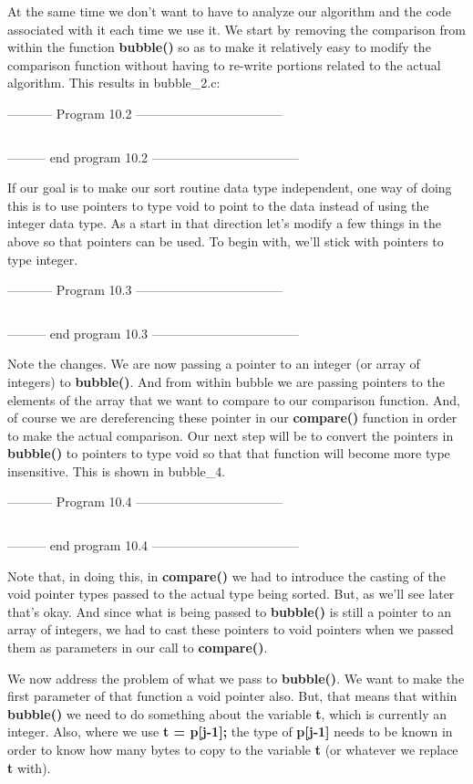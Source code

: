 At the same time we don't want to have to analyze our algorithm and the
code associated with it each time we use it. We start by removing the
comparison from within the function \textbf{bubble()} so as to make it
relatively easy to modify the comparison function without having to
re-write portions related to the actual algorithm. This results in
bubble\_2.c:

-----------  Program 10.2  -----------------------------------
\inputminted[breaklines]{c}{../src/ch10-2.c}
--------- end program 10.2 -----------------------------------

If our goal is to make our sort routine data type independent, one way
of doing this is to use pointers to type void to point to the data
instead of using the integer data type. As a start in that direction
let's modify a few things in the above so that pointers can be used. To
begin with, we'll stick with pointers to type integer.

-----------  Program 10.3  -----------------------------------
\inputminted[breaklines]{c}{../src/ch10-3.c}
--------- end program 10.3 -----------------------------------

Note the changes. We are now passing a pointer to an integer (or array
of integers) to \textbf{bubble()}. And from within bubble we are passing
pointers to the elements of the array that we want to compare to our
comparison function. And, of course we are dereferencing these pointer
in our \textbf{compare()} function in order to make the actual
comparison. Our next step will be to convert the pointers in
\textbf{bubble()} to pointers to type void so that that function will
become more type insensitive. This is shown in bubble\_4.

-----------  Program 10.4  -----------------------------------
\inputminted[breaklines]{c}{../src/ch10-4.c}
--------- end program 10.4 -----------------------------------

Note that, in doing this, in \textbf{compare()} we had to introduce the
casting of the void pointer types passed to the actual type being
sorted. But, as we'll see later that's okay. And since what is being
passed to \textbf{bubble()} is still a pointer to an array of integers,
we had to cast these pointers to void pointers when we passed them as
parameters in our call to \textbf{compare()}.

We now address the problem of what we pass to \textbf{bubble()}. We want
to make the first parameter of that function a void pointer also. But,
that means that within \textbf{bubble()} we need to do something about
the variable \textbf{t}, which is currently an integer. Also, where we
use \textbf{t = p{[}j-1{]};} the type of \textbf{p{[}j-1{]}} needs to be
known in order to know how many bytes to copy to the variable \textbf{t}
(or whatever we replace \textbf{t} with).

